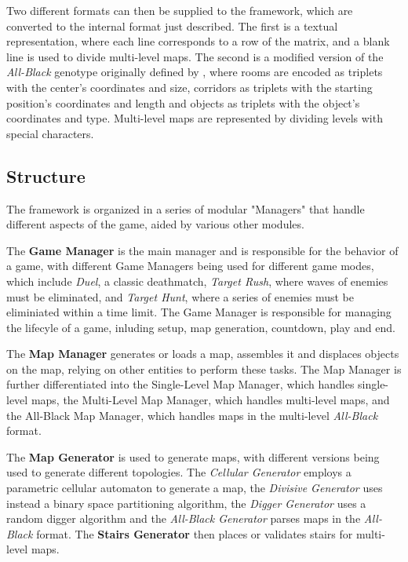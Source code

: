 \documentclass{Configuration_Files/PoliMi3i_thesis}
\begin{document}
Two different formats can then be supplied to the framework, which are converted to the internal format just described. The first is a textual representation, where each line corresponds to a row of the matrix, and a blank line is used to divide multi-level maps. The second is a modified version of the \textit{All-Black} genotype originally defined by \citeauthor{cardamone_evolving_2011}, where rooms are encoded as triplets with the center's coordinates and size, corridors as triplets with the starting position's coordinates and length and objects as triplets with the object's coordinates and type. Multi-level maps are represented by dividing levels with special characters.

\subsection{Structure}
\label{subsec:structure}
The framework is organized in a series of modular "Managers" that handle different aspects of the game, aided by various other modules.

The \textbf{Game Manager} is the main manager and is responsible for the behavior of a game, with different Game Managers being used for different game modes, which include \textit{Duel}, a classic deathmatch, \textit{Target Rush}, where waves of enemies must be eliminated, and \textit{Target Hunt}, where a series of enemies must be eliminiated within a time limit. The Game Manager is responsible for managing the lifecyle of a game, inluding setup, map generation, countdown, play and end.

The \textbf{Map Manager} generates or loads a map, assembles it and displaces objects on the map, relying on other entities to perform these tasks. The Map Manager is further differentiated into the Single-Level Map Manager, which handles single-level maps, the Multi-Level Map Manager, which handles multi-level maps, and the All-Black Map Manager, which handles maps in the multi-level \textit{All-Black} format.

The \textbf{Map Generator} is used to generate maps, with different versions being used to generate different topologies. The \textit{Cellular Generator} employs a parametric cellular automaton to generate a map, the \textit{Divisive Generator} uses instead a binary space partitioning algorithm, the \textit{Digger Generator} uses a random digger algorithm and the \textit{All-Black Generator} parses maps in the \textit{All-Black} format. The \textbf{Stairs Generator} then places or validates stairs for multi-level maps.
\end{document}
